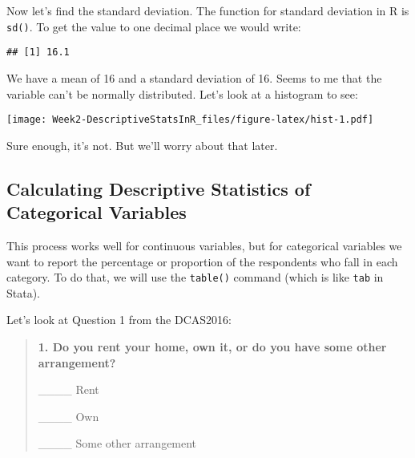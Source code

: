 \documentclass[]{article}
\newenvironment{Shaded}{\begin{snugshade}}{\end{snugshade}}
\newcommand{\KeywordTok}[1]{\textcolor[rgb]{0.13,0.29,0.53}{\textbf{{#1}}}}
\newcommand{\DecValTok}[1]{\textcolor[rgb]{0.00,0.00,0.81}{{#1}}}
\newcommand{\StringTok}[1]{\textcolor[rgb]{0.31,0.60,0.02}{{#1}}}
\newcommand{\NormalTok}[1]{{#1}}
\begin{document}
Now let's find the standard deviation. The function for standard
deviation in R is \texttt{sd()}. To get the value to one decimal place
we would write:

\begin{Shaded}
\end{Shaded}

\begin{verbatim}
## [1] 16.1
\end{verbatim}

We have a mean of 16 and a standard deviation of 16. Seems to me that
the variable can't be normally distributed. Let's look at a histogram to
see:

\begin{Shaded}
\end{Shaded}

\texttt{[image: Week2-DescriptiveStatsInR\_files/figure-latex/hist-1.pdf]}

Sure enough, it's not. But we'll worry about that later.

\subsection{Calculating Descriptive Statistics of Categorical
Variables}\label{calculating-descriptive-statistics-of-categorical-variables}

This process works well for continuous variables, but for categorical
variables we want to report the percentage or proportion of the
respondents who fall in each category. To do that, we will use the
\texttt{table()} command (which is like \texttt{tab} in Stata).

Let's look at Question 1 from the DCAS2016:

\begin{quote}
\textbf{1. Do you rent your home, own it, or do you have some other
arrangement?}

\_\_\_\_ Rent

\_\_\_\_ Own

\_\_\_\_ Some other arrangement
\end{quote}
\end{document}
